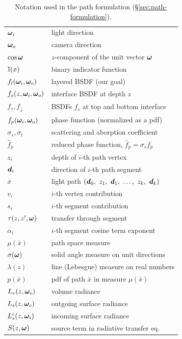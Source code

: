 \begin{table}
\caption{Notation used in the path formulation (\S\ref{sec:path-formulation}).}
\label{tab:notation}
\begin{tabular}{ll}
$\bm{\omega}_i$ & light direction \\
$\bm{\omega}_o$ & camera direction \\
$\cos \bm{\omega}$ & $z$-component of the unit vector $\bm{\omega}$ \\
$\mathbb{I}(x)$ & binary indicator function \\
\hline

$f_l(\bm{\omega}_i, \bm{\omega}_o)$ & layered BSDF (our goal) \\
$f_s(z, \bm{\omega}_i, \bm{\omega}_o)$ & interface BSDF at depth $z$ \\
$f_\uparrow, f_\downarrow$ & BSDFs $f_s$ at top and bottom interface \\
$f_p(\bm{\omega}_i, \bm{\omega}_o)$ & phase function (normalized as a pdf) \\
$\sigma_s, \sigma_t$ & scattering and aborption coefficient \\
$\hat f_p$ & reduced phase function, $\hat f_p = \sigma_s f_p$ \\
\hline

$z_i$ & depth of $i$-th path vertex \\
$\bm{d}_i$ & direction of $i$-th path segment \\
$\bar x$ & light path $(\bd_0,\ z_1,\ \bd_1,\ \dots,\ z_k,\ \bd_k)$ \\
$v_i$ & $i$-th vertex contribution \\
$s_i$ & $i$-th segment contribution \\
$\tau(z, z', \bm{\omega})$ & transfer through segment \\
$\alpha_i$ & $i$-th segment cosine term exponent \\
$\mu(\bar x)$ & path space measure \\
$\sigma(\bm{\omega})$ & solid angle measure on unit directions \\
$\lambda(z)$ & line (Lebesgue) measure on real numbers \\
$p(\bar x)$ & pdf of path $\bar x$ in measure $\mu(\bar x)$ \\
\hline

$L_v(z, \bm{\omega}_o)$ & volume radiance \\
$L_s(z, \bm{\omega}_o)$ & outgoing surface radiance \\
$L^i_s(z, \bm{\omega}_i)$ & incoming surface radiance \\
$S(z, \bm{\omega})$ & source term in radiative transfer eq. \\
\end{tabular}
\end{table}


